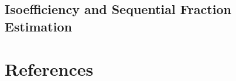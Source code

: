 \documentclass[12pt]{article}
\begin{document}
\subsection*{Isoefficiency and Sequential Fraction Estimation}

\section*{References}
\end{document}
